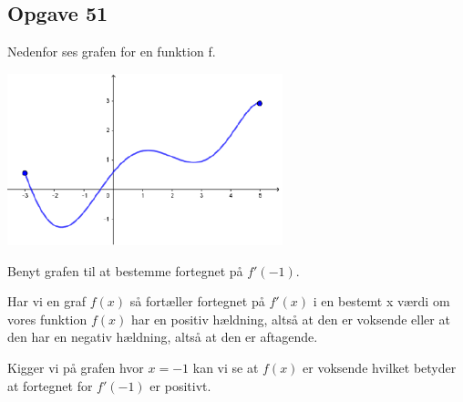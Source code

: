 \subsection{Opgave 51}

Nedenfor ses grafen for en funktion f.

\includegraphics[width=8cm]{Opgave_51-56/Opgave_51/51.png}

Benyt grafen til at bestemme fortegnet på $f'(-1)$.

\ans

Har vi en graf $f(x)$ så fortæller fortegnet på $f'(x)$ i en bestemt x værdi om vores funktion $f(x)$
har en positiv hældning, altså at den er voksende eller at den har en negativ hældning, altså at den er aftagende.

Kigger vi på grafen hvor $x = -1$ kan vi se at $f(x)$ er voksende hvilket betyder at fortegnet for $f'(-1)$ er positivt.




